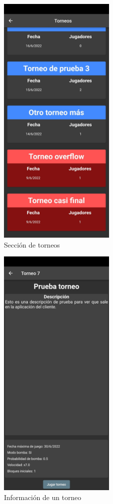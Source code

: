 \documentclass{article}
\begin{document}
\begin{figure}[H]
  \centering
  \includegraphics[width=0.5\textwidth]{imagenes/torneos.jpeg}
  \caption{Sección de torneos} 
\end{figure} 

\begin{figure}[H]
  \centering
  \includegraphics[width=0.5\textwidth]{imagenes/torneo.jpeg}
  \caption{Información de un torneo} 
\end{figure} 
\end{document}
